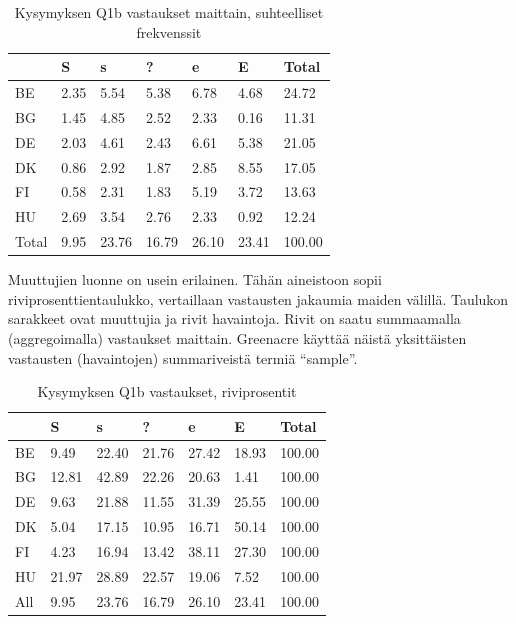 \documentclass[
  finnish,
]{book}
\begin{document}
\begin{table}

\caption{\label{tab:simpeCA-frekTa1}Kysymyksen Q1b vastaukset maittain, suhteelliset frekvenssit}
\centering
\begin{tabular}[t]{lllllll}
\toprule
  & S & s & ? & e & E & Total\\
\midrule
BE & 2.35 & 5.54 & 5.38 & 6.78 & 4.68 & 24.72\\
BG & 1.45 & 4.85 & 2.52 & 2.33 & 0.16 & 11.31\\
DE & 2.03 & 4.61 & 2.43 & 6.61 & 5.38 & 21.05\\
DK & 0.86 & 2.92 & 1.87 & 2.85 & 8.55 & 17.05\\
FI & 0.58 & 2.31 & 1.83 & 5.19 & 3.72 & 13.63\\
\addlinespace
HU & 2.69 & 3.54 & 2.76 & 2.33 & 0.92 & 12.24\\
Total & 9.95 & 23.76 & 16.79 & 26.10 & 23.41 & 100.00\\
\bottomrule
\end{tabular}
\end{table}

Muuttujien luonne on usein erilainen. Tähän aineistoon sopii
riviprosenttientaulukko, vertaillaan vastausten jakaumia maiden välillä. Taulukon
sarakkeet ovat muuttujia ja rivit havaintoja. Rivit on saatu summaamalla
(aggregoimalla) vastaukset maittain. Greenacre käyttää näistä yksittäisten
vastausten (havaintojen) summariveistä termiä ``sample''.

\begin{table}

\caption{\label{tab:simpeCA-rprosTa1}Kysymyksen Q1b vastaukset, riviprosentit}
\centering
\begin{tabular}[t]{lllllll}
\toprule
  & S & s & ? & e & E & Total\\
\midrule
BE & 9.49 & 22.40 & 21.76 & 27.42 & 18.93 & 100.00\\
BG & 12.81 & 42.89 & 22.26 & 20.63 & 1.41 & 100.00\\
DE & 9.63 & 21.88 & 11.55 & 31.39 & 25.55 & 100.00\\
DK & 5.04 & 17.15 & 10.95 & 16.71 & 50.14 & 100.00\\
FI & 4.23 & 16.94 & 13.42 & 38.11 & 27.30 & 100.00\\
\addlinespace
HU & 21.97 & 28.89 & 22.57 & 19.06 & 7.52 & 100.00\\
All & 9.95 & 23.76 & 16.79 & 26.10 & 23.41 & 100.00\\
\bottomrule
\end{tabular}
\end{table}
\end{document}
